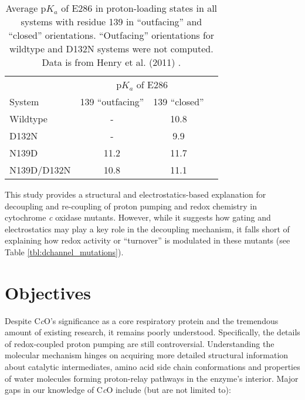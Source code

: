 \begin{table}
    \begin{center}
    \begin{singlespaced}
    \caption{Average p$K_a$ of E286 in proton-loading states in all systems with residue 139 in ``outfacing'' and ``closed'' orientations. ``Outfacing'' orientations for wildtype and D132N systems were not computed. Data is from Henry et al. (2011) \cite{Henry:2011p10221}.}
    \label{tbl:e286_pkas}
    \vspace{10pt}
    \begin{tabular}{lccc}
            & \multicolumn{2}{c}{p$K_a$ of E286} \\
    System  & 139 ``outfacing'' & 139 ``closed'' \\
    \hline
    Wildtype & - & 10.8 \\
    D132N & - & 9.9 \\
    N139D & 11.2 & 11.7 \\
    N139D/D132N & 10.8 & 11.1 \\
    \hline
    \end{tabular}
    \end{singlespaced}
    \end{center}
\end{table}

This study provides a structural and electrostatics-based explanation for decoupling and re-coupling of proton pumping and redox chemistry in cytochrome \emph{c} oxidase mutants. However, while it suggests how gating and electrostatics may play a key role in the decoupling mechanism, it falls short of explaining how redox activity or ``turnover'' is modulated in these mutants (see Table \ref{tbl:dchannel_mutations}).

\section{Objectives}

Despite C\emph{c}O's significance as a core respiratory protein and the tremendous amount of existing research, it remains poorly understood. Specifically, the details of redox-coupled proton pumping are still controversial. Understanding the molecular mechanism hinges on acquiring more detailed structural information about catalytic intermediates, amino acid side chain conformations and properties of water molecules forming proton-relay pathways in the enzyme's interior. Major gaps in our knowledge of C\emph{c}O include (but are not limited to):


